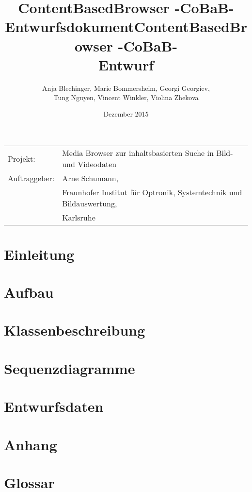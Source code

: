 \documentclass[parskip=full]{scrartcl}
\title{ContentBasedBrowser -CoBaB- \\ Entwurfsdokument}
\begin{document}
\begin{titlepage}
\title{ContentBasedBrowser -CoBaB- \\ Entwurf}
\author{Anja Blechinger, Marie Bommersheim, Georgi Georgiev,\\ Tung Nguyen, Vincent Winkler, Violina Zhekova}
\date{Dezember 2015}
\maketitle
\vspace{300pt}
\begin{tabular}{l l}
Projekt: & Media Browser zur inhaltsbasierten Suche in Bild- und Videodaten\\
Auftraggeber: & Arne Schumann,\\
 & Fraunhofer Institut für Optronik, Systemtechnik und Bildauswertung,\\
 & Karlsruhe\\
\end{tabular}
\thispagestyle{empty}
\end{titlepage}
\setcounter{page}{1}

\tableofcontents

\section{Einleitung}


\section{Aufbau}


\section{Klassenbeschreibung}


\section{Sequenzdiagramme}


\section{Entwurfsdaten}


\section{Anhang}


\section{Glossar}
\end{document}
